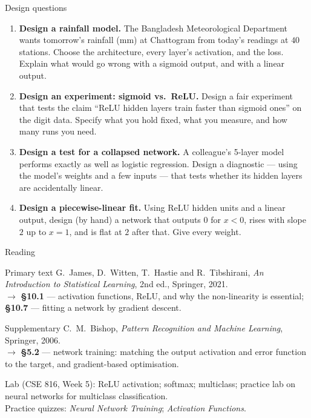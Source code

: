 \documentclass[aspectratio=169,10pt]{beamer}
\begin{document}
\begin{frame}{Design questions}
  \footnotesize
  \begin{enumerate}
    \item \textbf{Design a rainfall model.} The Bangladesh Meteorological Department wants
          tomorrow's rainfall (mm) at Chattogram from today's readings at $40$ stations.
          Choose the architecture, every layer's activation, and the loss. Explain what
          would go wrong with a sigmoid output, and with a linear output.
          \hfill{}
    \item \textbf{Design an experiment: sigmoid vs.\ ReLU.} Design a fair experiment that
          tests the claim ``ReLU hidden layers train faster than sigmoid ones'' on the digit
          data. Specify what you hold fixed, what you measure, and how many runs you need.
          \hfill{}
    \item \textbf{Design a test for a collapsed network.} A colleague's 5-layer model
          performs exactly as well as logistic regression. Design a diagnostic --- using
          the model's weights and a few inputs --- that tests whether its hidden layers
          are accidentally linear. \hfill{}
    \item \textbf{Design a piecewise-linear fit.} Using ReLU hidden units and a linear
          output, design (by hand) a network that outputs $0$ for $x<0$, rises with slope
          $2$ up to $x=1$, and is flat at $2$ after that. Give every weight.
          \hfill{}
  \end{enumerate}
\end{frame}

\begin{frame}{Reading}
  \begin{block}{Primary text}
    G.~James, D.~Witten, T.~Hastie and R.~Tibshirani,
    \emph{An Introduction to Statistical Learning}, 2nd ed., Springer, 2021.\\[2pt]
    \hfill{\small$\rightarrow$ \textbf{\S10.1} --- activation functions, ReLU, and why the
    non-linearity is essential; \textbf{\S10.7} --- fitting a network by gradient
    descent.}
  \end{block}
  \begin{block}{Supplementary}
    C.~M.~Bishop, \emph{Pattern Recognition and Machine Learning}, Springer, 2006.\\[2pt]
    \hfill{\small$\rightarrow$ \textbf{\S5.2} --- network training: matching the output
    activation and error function to the target, and gradient-based optimisation.}
  \end{block}
  \vspace{1mm}
  \begin{center}
    \small\color{cugray}
    Lab (CSE 816, Week 5): ReLU activation; softmax; multiclass; practice lab on neural
    networks for multiclass classification.\\
    Practice quizzes: \emph{Neural Network Training}; \emph{Activation Functions}.
  \end{center}
\end{frame}
\end{document}
